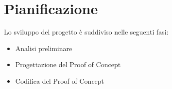 \section{Pianificazione}
Lo sviluppo del progetto è suddiviso nelle seguenti fasi:
    \begin{itemize}
        \item Analisi preliminare
        \item Progettazione del Proof of Concept
        \item Codifica del Proof of Concept
    \end{itemize}